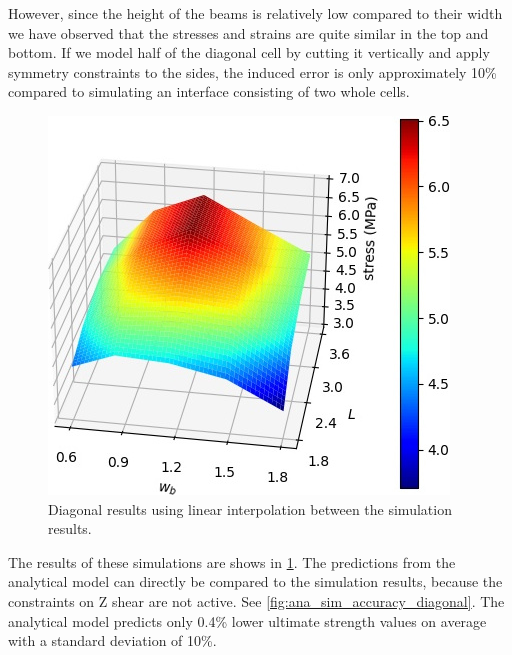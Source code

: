 However, since the height of the beams is relatively low compared to their width we have observed that the stresses and strains are quite similar in the top and bottom.
If we model half of the diagonal cell by cutting it vertically and apply symmetry constraints to the sides,
the induced error is only approximately 10\% compared to simulating an interface consisting of two whole cells.



\begin{figure}
	\centering
	\includegraphics[width=.7\columnwidth]{sources/simulation/diagonal_sim_response.jpg}
	\caption{Diagonal results using linear interpolation between the simulation results.}
	\label{fig:sim_diagonal_model}
\end{figure}


The results of these simulations are shows in \cref{fig:sim_diagonal_model}.
The predictions from the analytical model can directly be compared to the simulation results, because the constraints on Z shear are not active.
See \cref{fig:ana_sim_accuracy_diagonal}.
The analytical model predicts only 0.4\% lower ultimate strength values on average with a standard deviation of 10\%.





